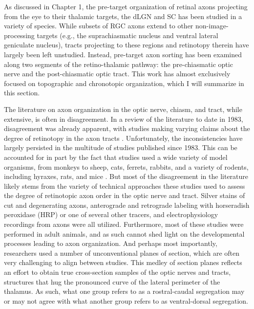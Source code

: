 \label{sec:RetinogeniculateOrganization}
As discussed in Chapter 1, the pre-target organization of retinal axons projecting from the eye to their thalamic targets, the dLGN and SC has been studied in a variety of species.
While subsets of RGC axons extend to other non-image-processing targets (e.g., the suprachiasmatic nucleus and ventral lateral geniculate nucleus), tracts projecting to these regions and retinotopy therein have largely been left unstudied.
Instead, pre-target axon sorting has been examined along two segments of the retino-thalamic pathway: the pre-chiasmatic optic nerve and the post-chiasmatic optic tract.
This work has almost exclusively focused on topographic and chronotopic organization, which I will summarize in this section.

The literature on axon organization in the optic nerve, chiasm, and tract, while extensive, is often in disagreement.
In a review of the literature to date in 1983, disagreement was already apparent, with studies making varying claims about the degree of retinotopy in the axon tracts \cite{martin1983role}.
Unfortunately, the inconsistencies have largely persisted in the multitude of studies published since 1983.
This can be accounted for in part by the fact that studies used a wide variety of model organisms, from monkeys to sheep, cats, ferrets, rabbits, and a variety of rodents, including hyraxes, rats, and mice \cite{martin1983role}. 
But most of the disagreement in the literature likely stems from the variety of technical approaches these studies used to assess the degree of retinotopic axon order in the optic nerve and tract.
Silver stains of cut and degenerating axons, anterograde and retrograde labeling with horseradish peroxidase (HRP) or one of several other tracers, and electrophysiology recordings from axons were all utilized.
Furthermore, most of these studies were performed in adult animals, and as such cannot shed light on the developmental processes leading to axon organization.
And perhaps most importantly, researchers used a number of unconventional planes of section, which are often very challenging to align between studies.
This medley of section planes reflects an effort to obtain true cross-section samples of the optic nerves and tracts, structures that hug the pronounced curve of the lateral perimeter of the thalamus.
As such, what one group refers to as a rostral-caudal segregation may or may not agree with what another group refers to as ventral-dorsal segregation. %

